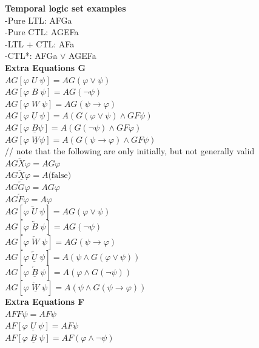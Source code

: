 \documentclass{article}
\begin{document}
\begin{multicols}{4}
\textbf{Temporal logic set examples} \\
-Pure LTL: AFGa \\
-Pure CTL: AGEFa \\
-LTL + CTL: AFa \\
-CTL*: AFGa $\vee$ AGEFa \\

\textbf{Extra Equations G}\\
$ AG[\varphi \; U \; \psi] = AG(\varphi \vee \psi)$\\
$ AG[\varphi \; B \; \psi] = AG(\neg \psi)$\\
$ AG[\varphi \; W \; \psi] = AG(\psi \rightarrow \varphi)$\\
$ AG[\varphi \; \underline{U} \; \psi]  =  A(G(\varphi \vee \psi)  \wedge G F \psi)$ \\
$AG[\varphi \; \underline{B} \psi] = A (G(\neg \psi)   \wedge G F \varphi )$\\
$AG[\varphi \; \underline{W} \psi] = A (G(\psi \rightarrow \varphi) \wedge G F \psi )$\\
// note that the following are only initially, but not generally valid\\
$AG \overleftarrow{X} \varphi = A G \varphi $\\
$AG \underline{\overleftarrow{X}} \varphi = A \text{(false)}$\\
$AG \overleftarrow{G} \varphi = A G \varphi $\\
$AG \overleftarrow{F} \varphi = A \varphi $\\
$AG[\varphi \; \overleftarrow{U}\; \psi] = A G(\varphi \vee \psi) $\\
$AG[\varphi \; \overleftarrow{B}\; \psi] = A G(\neg \psi) $\\
$AG[\varphi \; \overleftarrow{W}\; \psi] = A G(\psi \rightarrow \varphi)$\\
$AG[\varphi \; \underline{\overleftarrow{U}}\;  \psi] = A (\psi \wedge G(\varphi \vee \psi))$\\
$AG[\varphi \; \underline{\overleftarrow{B}}\;  \psi] = A (\varphi \wedge G(\neg \psi))$\\
$AG[\varphi \; \underline{\overleftarrow{W}}\;  \psi] = A (\psi \wedge G(\psi \rightarrow \varphi))$\\
\textbf{Extra Equations F}\\
$ A F F \psi = A F \psi $\\
$ A F[\varphi \; \underline{U}\; \psi]  = A F \psi $\\
$ A F[\varphi \; \underline{B}\; \psi]  = A F(\varphi \wedge \neg \psi) $\\

\end{multicols}
\end{document}
